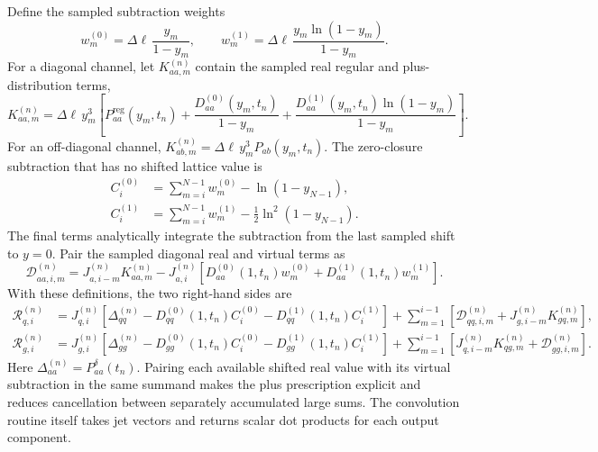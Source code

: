 \documentclass[11pt]{article}
\begin{document}
Define the sampled subtraction weights
\begin{equation}
  w_m^{(0)}=\Delta\ell\,\frac{y_m}{1-y_m},
  \qquad
  w_m^{(1)}=\Delta\ell\,
  \frac{y_m\ln(1-y_m)}{1-y_m}.
\end{equation}
For a diagonal channel, let \(K_{aa,m}^{(n)}\) contain the sampled real
regular and plus-distribution terms,
\begin{equation}
  K_{aa,m}^{(n)}
  =
  \Delta\ell\,y_m^3
  \left[
    P_{aa}^{\mathrm{reg}}(y_m,t_n)
    +\frac{D_{aa}^{(0)}(y_m,t_n)}{1-y_m}
    +\frac{D_{aa}^{(1)}(y_m,t_n)\ln(1-y_m)}{1-y_m}
  \right].
\end{equation}
For an off-diagonal channel,
\(K_{ab,m}^{(n)}=\Delta\ell\,y_m^3P_{ab}(y_m,t_n)\).
The zero-closure subtraction that has no shifted lattice value is
\begin{align}
  C_i^{(0)}
  &=
  \sum_{m=i}^{N-1}w_m^{(0)}
  -\ln(1-y_{N-1}),\\
  C_i^{(1)}
  &=
  \sum_{m=i}^{N-1}w_m^{(1)}
  -\frac12\ln^2(1-y_{N-1}).
\end{align}
The final terms analytically integrate the subtraction from the last sampled
shift to \(y=0\). Pair the sampled diagonal real and virtual terms as
\begin{equation}
  \mathcal D_{aa,i,m}^{(n)}
  =
  J_{a,i-m}^{(n)}K_{aa,m}^{(n)}
  -
  J_{a,i}^{(n)}
  \left[
    D_{aa}^{(0)}(1,t_n)w_m^{(0)}
    +D_{aa}^{(1)}(1,t_n)w_m^{(1)}
  \right].
  \label{eq:paired-diagonal}
\end{equation}
With these definitions, the two right-hand sides are
\begin{align}
  \mathcal R_{q,i}^{(n)}
  &=
  J_{q,i}^{(n)}
  \left[
    \Delta_{qq}^{(n)}
    -D_{qq}^{(0)}(1,t_n)C_i^{(0)}
    -D_{qq}^{(1)}(1,t_n)C_i^{(1)}
  \right]
  +
  \sum_{m=1}^{i-1}
  \left[
    \mathcal D_{qq,i,m}^{(n)}
    +J_{g,i-m}^{(n)}K_{gq,m}^{(n)}
  \right],
  \label{eq:discrete-rhs-q}\\
  \mathcal R_{g,i}^{(n)}
  &=
  J_{g,i}^{(n)}
  \left[
    \Delta_{gg}^{(n)}
    -D_{gg}^{(0)}(1,t_n)C_i^{(0)}
    -D_{gg}^{(1)}(1,t_n)C_i^{(1)}
  \right]
  +
  \sum_{m=1}^{i-1}
  \left[
    J_{q,i-m}^{(n)}K_{qg,m}^{(n)}
    +\mathcal D_{gg,i,m}^{(n)}
  \right].
  \label{eq:discrete-rhs-g}
\end{align}
Here \(\Delta_{aa}^{(n)}=P_{aa}^{\delta}(t_n)\). Pairing each available
shifted real value with its virtual subtraction in the same summand makes the
plus prescription explicit and reduces cancellation between separately
accumulated large sums. The convolution routine itself takes jet vectors and
returns scalar dot products for each output component.
\end{document}
